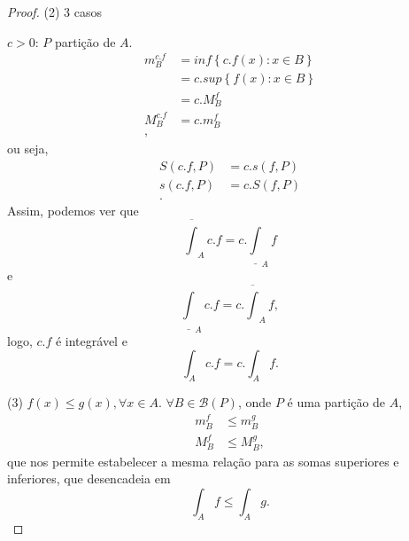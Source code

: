 \begin{proof}
    (2) 3 casos

    $c>0$:  $P$ partição de $A$. 
    \begin{align*}
	m_B^{c.f} &= inf\left\{ c.f(x): x\in B \right\} \\
		  &= c.sup\left\{ f(x): x\in B \right\} \\
		  &= c.M_B^{f} \\
	M_B^{c.f} &= c.m_B^{f} \\
    ,\end{align*}
    ou seja,
    \begin{align*}
	S\left( c.f, P \right) &= c.s\left( f,P \right) \\
	s\left( c.f, P \right) &= c.S\left( f,P \right) \\
    .\end{align*}
    Assim, podemos ver que \[
	\overline{\int}_A c.f = c.\underline{\int}_A f
    \] e \[
	\underline{\int}_A c.f = c.\overline{\int}_A f
    ,\] logo, $c.f$ é integrável e \[
    \int_A c.f = c.\int_A f
    .\] 

    (3) $f(x) \le g(x), \forall x\in A$. $\forall B\in \mathcal{B}\left( P \right) $, onde $P$ é uma partição de $A$,
    \begin{align*}
	m_B^{f}&\le m_B^{g} \\
	M_B^{f} &\le M_B^{g}
    ,\end{align*}
    que nos permite estabelecer a mesma relação para as somas superiores e inferiores, que desencadeia em  \[
    \int_A f\le \int_A g
    .\] 
\end{proof}


